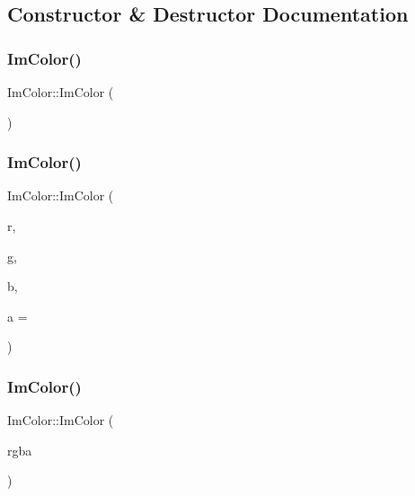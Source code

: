 \subsection{Constructor \& Destructor Documentation}
\hypertarget{struct_im_color_a95206b688dcc03f725790538c74f4526}{}\label{struct_im_color_a95206b688dcc03f725790538c74f4526} 
\subsubsection{\texorpdfstring{Im\+Color()}{ImColor()}\hspace{0.1cm}{\footnotesize\ttfamily [1/5]}}
{\footnotesize\ttfamily Im\+Color\+::\+Im\+Color (\begin{DoxyParamCaption}{ }\end{DoxyParamCaption})}

\hypertarget{struct_im_color_ab4ba02f8290d5dadc1ebc57b2c8a9cbe}{}\label{struct_im_color_ab4ba02f8290d5dadc1ebc57b2c8a9cbe} 
\subsubsection{\texorpdfstring{Im\+Color()}{ImColor()}\hspace{0.1cm}{\footnotesize\ttfamily [2/5]}}
{\footnotesize\ttfamily Im\+Color\+::\+Im\+Color (\begin{DoxyParamCaption}\item[{int}]{r,  }\item[{int}]{g,  }\item[{int}]{b,  }\item[{int}]{a = {} }\end{DoxyParamCaption})}

\hypertarget{struct_im_color_ad306332841a2b1f903f40262a19f9412}{}\label{struct_im_color_ad306332841a2b1f903f40262a19f9412} 
\subsubsection{\texorpdfstring{Im\+Color()}{ImColor()}\hspace{0.1cm}{\footnotesize\ttfamily [3/5]}}
{\footnotesize\ttfamily Im\+Color\+::\+Im\+Color (\begin{DoxyParamCaption}\item[{Im\+U32}]{rgba }\end{DoxyParamCaption})}

